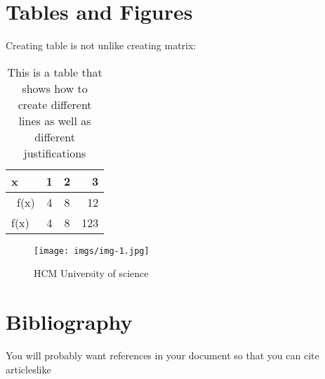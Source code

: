 \documentclass{article}
\begin{document}
\section{Tables and Figures}
\text Creating table is not unlike creating matrix:
\begin{table}
    \caption{This is a table that shows how to create different lines as well as different justifications}
    \label{tab:my_label}
    \centering
    \begin{tabular}{|l||c|c|r|} 
    \hline
     x & 1 & 2 & 3 \\
    \hline\
    f(x) & 4 & 8 & 12 \\
    f(x) & 4 & 8 & 123 \\
    \hline
\end{tabular}
\end{table}

\begin{figure}[htp]
    \centering
    \texttt{[image: imgs/img-1.jpg]}
    \caption{HCM University of science}
    \label{fig:HCM University of science}
\end{figure}

\section{Bibliography}
You will probably want references in your document so that you can cite articleslike ~\cite{frenkel_temperature_2012, frenkel_fine_2013, frenkel_optical_2013}



 
\end{document}
